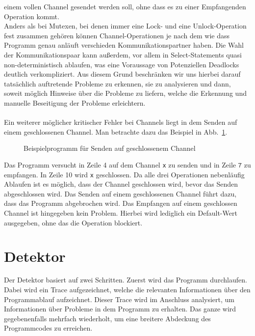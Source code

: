 einem vollen Channel gesendet werden soll, ohne dass es zu einer Empfangenden
Operation kommt.\\
Anders als bei Mutexen, bei denen immer eine Lock-
und eine Unlock-Operation fest zusammen gehören können Channel-Operationen
je nach dem wie dass Programm genau anläuft verschieden Kommunikationspartner 
haben. Die Wahl der Kommunikationspaar kann außerdem, vor allem in Select-Statements
quasi non-deterministisch ablaufen, was eine Voraussage von Potenziellen 
Deadlocks deutlich verkompliziert. Aus diesem Grund beschränken wir uns 
hierbei darauf tatsächlich auftretende Probleme zu erkennen, sie zu analysieren 
und dann, soweit möglich Hinweise über die Probleme zu liefern, welche die 
Erkennung und manuelle Beseitigung der Probleme erleichtern.\\\\
Ein weiterer möglicher kritischer Fehler bei Channels liegt in dem 
Senden auf einem geschlossenen Channel. Man betrachte dazu das Beispiel in 
Abb.~\ref{Chap:Analyze-Sec:Channel-SubSec:Close-Fig:close}. 
\begin{figure}[h!]
  
  \caption{Beispielprogramm für Senden auf geschlossenem Channel} 
  \label{Chap:Analyze-Sec:Channel-SubSec:Close-Fig:close}
\end{figure}
Das Programm 
versucht in Zeile 4 auf dem Channel \texttt{x} zu senden und in Zeile 
$\texttt{7}$ zu empfangen. In Zeile 10 wird \texttt{x} geschlossen. Da alle 
drei Operationen nebenläufig Ablaufen ist es möglich, dass der Channel 
geschlossen wird, bevor das Senden abgeschlossen wird.
Das Senden auf einem geschlossenen Channel führt dazu, dass das Programm 
abgebrochen wird. 
Das Empfangen auf einem geschlossen Channel ist hingegeben kein Problem.
Hierbei wird lediglich ein Default-Wert ausgegeben, ohne das die Operation
blockiert. 


\section{Detektor}
Der Detektor basiert auf zwei Schritten. Zuerst wird das Programm 
durchlaufen. Dabei wird ein Trace aufgezeichnet, welche die relevanten 
Informationen über den Programmablauf aufzeichnet. Dieser 
Trace wird im Anschluss analysiert, um Informationen über Probleme 
in dem Programm zu erhalten. Das ganze wird gegebenenfalls mehrfach wiederholt,
um eine breitere Abdeckung des Programmcodes zu erreichen.



